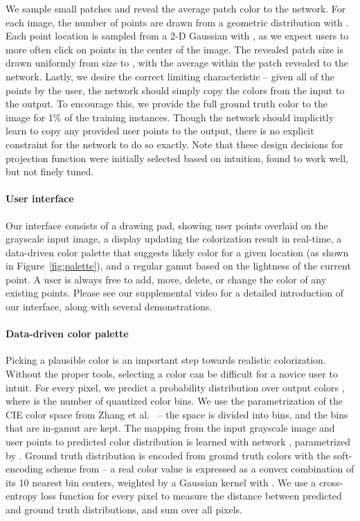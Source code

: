 \documentclass[acmtog,authorversion]{acmart}
\begin{document}
We sample small patches and reveal the average patch color to the network. For each image, the number of points are drawn from a geometric distribution with . Each point location is sampled from a 2-D Gaussian with , as we expect users to more often click on points in the center of the image. The revealed patch size is drawn uniformly from size  to , with the average  within the patch revealed to the network. Lastly, we desire the correct limiting characteristic -- given all of the points by the user, the network should simply copy the colors from the input to the output. To encourage this, we provide the full ground truth color to the image for 1\% of the training instances. Though the network should implicitly learn to copy any provided user points to the output, there is no explicit constraint for the network to do so exactly. Note that these design decisions for projection function  were initially selected based on intuition, found to work well, but not finely tuned.

\paragraph{User interface} Our interface consists of a drawing pad, showing user points overlaid on the grayscale input image, a display updating the colorization result in real-time, a data-driven color palette that suggests likely color for a given location (as shown in Figure~\ref{fig:palette}), and a regular  gamut based on the lightness of the current point. A user is always free to add, move, delete, or change the color of any existing points. Please see our supplemental video for a detailed introduction of our interface, along with several demonstrations. 

\paragraph{Data-driven color palette} Picking a plausible color is an important step towards realistic colorization. Without the proper tools, selecting a color can be difficult for a novice user to intuit. For every pixel, we predict a probability distribution over output colors , where  is the number of quantized color bins. We use the parametrization of the CIE  color space from Zhang et al.~ -- the  space is divided into  bins, and the  bins that are in-gamut are kept. The mapping from the input grayscale image and user points to predicted color distribution  is learned with network , parametrized by . Ground truth distribution  is encoded from ground truth colors  with the soft-encoding scheme from \cite{zhang2016colorful} -- a real  color value is expressed as a convex combination of its 10 nearest bin centers, weighted by a Gaussian kernel with . We use a cross-entropy loss function for every pixel to measure the distance between predicted and ground truth distributions, and sum over all pixels.
\end{document}
